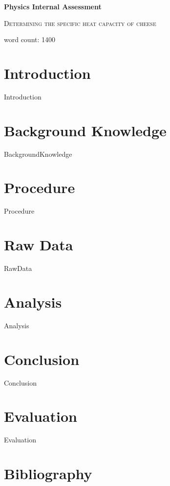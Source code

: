 \documentclass[12pt,a4paper]{article}
\begin{document}
	\begin{titlepage}
		\centering
		{\huge\bfseries Physics Internal Assessment\par}
		\vspace{1cm}
		{\scshape\Large Determining the specific heat capacity of cheese\par}
		\vspace{0.5cm}
		{word count: 1400}
	\end{titlepage}

	\tableofcontents
\section{Introduction}
	{Introduction}
\section{Background Knowledge}
	{BackgroundKnowledge}
\section{Procedure}
	{Procedure}
\section{Raw Data}
	{RawData}
\section{Analysis}
		{Analysis}
\section{Conclusion}
	{Conclusion}
\section{Evaluation}
	{Evaluation}
\section{Bibliography}
	
\end{document}
